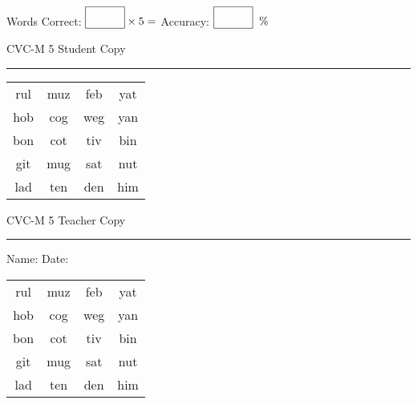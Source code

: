 \documentclass{memoir}
\begin{document}
\small

Words Correct: $\fbox{\phantom{\huge 100}} \times 5 = $ Accuracy: $\fbox{\phantom{\huge 100}}\;\; \%$ 

\vfill

\newpage


\footnotesize \noindent
CVC-M 5 \hfill Student Copy
\smallskip
\hrule

\Large

\setlength{\tabcolsep}{14pt}
\def\arraystretch{2}

{\selectfont


\begin{vplace}[0.5]
\begin{center}
\begin{tabular}{cccc}
rul & muz & feb & yat \\
hob & cog & weg & yan \\
bon & cot & tiv & bin \\
git & mug & sat & nut \\
lad & ten & den & him \\
\end{tabular}
\end{center}
\end{vplace}

}

\newpage

\footnotesize \noindent
CVC-M 5 \hfill Teacher Copy
\smallskip
\hrule

\small

\vfill

\noindent
Name: \underline{\hspace{1.75in}} \hfill Date: \underline{\hspace{1in}}

\Large

{\selectfont


\begin{vplace}[0.5]
\begin{center}
\begin{tabular}{cccc}
rul & muz & feb & yat \\
hob & cog & weg & yan \\
bon & cot & tiv & bin \\
git & mug & sat & nut \\
lad & ten & den & him \\
\end{tabular}
\end{center}
\end{vplace}



}
\end{document}
